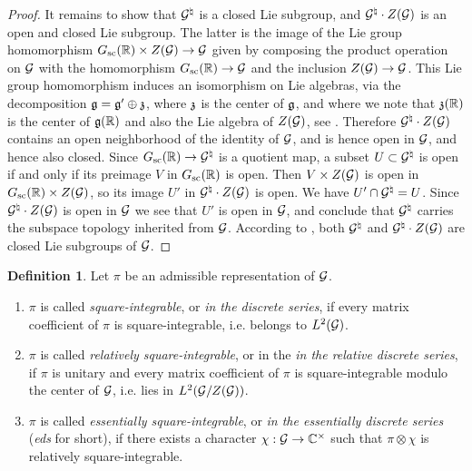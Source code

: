 \documentclass{article}
\theoremstyle{definition}
\newtheorem{dfn}[thm]{Definition}
\numberwithin{equation}{section}
\renewcommand{\-}{\hyp{}}
\begin{document}
\begin{proof}
	It remains to show that $\mathcal{G}^\natural$ is a closed Lie subgroup, and $\mathcal{G}^\natural \cdot Z(\mathcal{G})$ is an open and closed Lie subgroup. The latter is the image of the Lie group homomorphism $G_{\textrm{sc}}(\mathbb{R}) \times Z(\mathcal{G}) \to \mathcal{G}$ given by composing the product operation on $\mathcal{G}$ with the homomorphism $G_{\textrm{sc}}(\mathbb{R}) \to \mathcal{G}$ and the inclusion $Z(\mathcal{G}) \to \mathcal{G}$. This Lie group homomorphism induces an isomorphism on Lie algebras, via the decomposition $\mathfrak{g}=\mathfrak{g}' \oplus \mathfrak{z}$, where $\mathfrak{z}$ is the center of $\mathfrak{g}$, and where we note that $\mathfrak{z}(\mathbb{R})$ is the center of $\mathfrak{g}(\mathbb{R})$ and also the Lie algebra of $Z(\mathcal{G})$, see \cite[Chapter III, \S9, no. 3, Proposition 9]{BourLie1-3}. Therefore $\mathcal{G}^\natural \cdot Z(\mathcal{G})$ contains an open neighborhood of the identity of $\mathcal{G}$, and is hence open in $\mathcal{G}$, and hence also closed. Since $G_{\textrm{sc}}(\mathbb{R}) \to \mathcal{G}^\natural$ is a quotient map, a subset $U \subset \mathcal{G}^\natural$ is open if and only if its preimage $V$ in $G_{\textrm{sc}}(\mathbb{R})$ is open. Then $V \times Z(\mathcal{G})$ is open in $G_{\textrm{sc}}(\mathbb{R}) \times Z(\mathcal{G})$, so its image $U'$ in $\mathcal{G}^\natural \cdot Z(\mathcal{G})$ is open. We have $U' \cap \mathcal{G}^\natural = U$. Since $\mathcal{G}^\natural \cdot Z(\mathcal{G})$ is open in $\mathcal{G}$ we see that $U'$ is open in $\mathcal{G}$, and conclude that $\mathcal{G}^\natural$ carries the subspace topology inherited from $\mathcal{G}$. According to \cite[Chapter III, \S6, no. 2, Proposition 2]{BourLie1-3}, both $\mathcal{G}^\natural$ and $\mathcal{G}^\natural \cdot Z(\mathcal{G})$ are closed Lie subgroups of $\mathcal{G}$.
\end{proof}

\begin{dfn}
	Let $\pi$ be an admissible representation of $\mathcal{G}$.
	\begin{enumerate}
		\item $\pi$ is called \emph{square-integrable}, or \emph{in the discrete series}, if every matrix coefficient of $\pi$ is square-integrable, i.e. belongs to $L^2(\mathcal{G})$.
  		\item $\pi$ is called \emph{relatively square-integrable}, or in the \emph{in the relative discrete series}, if $\pi$ is unitary and 
                  every matrix coefficient of $\pi$ is square-integrable modulo the center of $\mathcal{G}$, i.e. lies in $L^2(\mathcal{G}/Z(\mathcal{G}))$.

  		\item $\pi$ is called  \emph{essentially square-integrable}, or  \emph{in the essentially discrete series} (\emph{eds} for short), if there exists a character $\chi : \mathcal{G} \to \mathbb{C}^\times$ such that $\pi \otimes \chi$ is relatively square-integrable.
	\end{enumerate}
\end{dfn}
\end{document}

